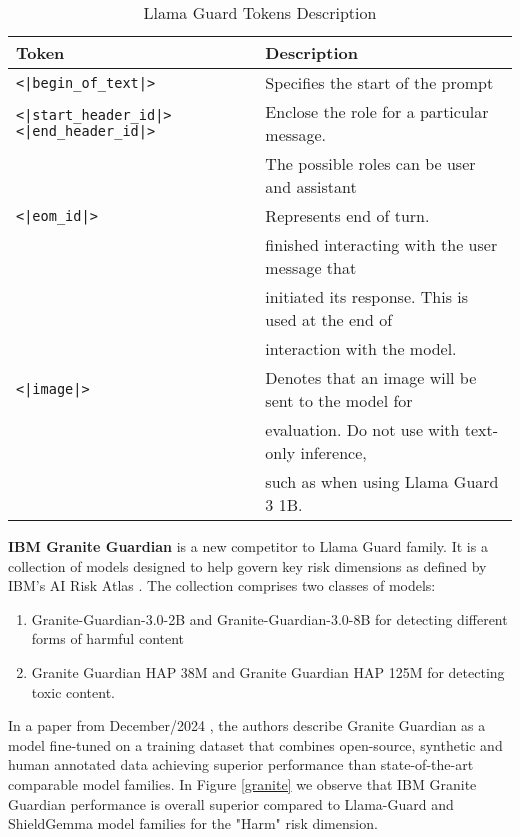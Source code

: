 \begin{table*}[h!]
\caption{Llama Guard Tokens Description}
\label{table:guard}
\begin{tabular}{ll}
\hline
Token & Description \\
\hline
\texttt{<|begin\_of\_text|>} & Specifies the start of the prompt \\
\texttt{<|start\_header\_id|>} \texttt{<|end\_header\_id|>} & Enclose the role for a particular message. \\
& The possible roles can be user and assistant \\
\texttt{<|eom\_id|>} & Represents end of turn. \\
& finished interacting with the user message that \\
& initiated its response. This is used at the end of \\
& interaction with the model. \\
\texttt{<|image|>} & Denotes that an image will be sent to the model for \\
& evaluation. Do not use with text-only inference, \\
& such as when using Llama Guard 3 1B. \\
\hline
\end{tabular}
\end{table*}


\textbf{IBM Granite Guardian}  is a new competitor to Llama Guard family. It is a collection of models designed to help govern key risk dimensions as defined by IBM's AI Risk Atlas . The collection comprises two classes of models:
\begin{enumerate}
    \item Granite-Guardian-3.0-2B and Granite-Guardian-3.0-8B for detecting different forms of harmful content 
    \item Granite Guardian HAP 38M and Granite Guardian HAP 125M for detecting toxic content.
\end{enumerate}

In a paper from December/2024 , the authors describe Granite Guardian as a model fine-tuned on a training dataset that combines open-source, synthetic and human annotated data achieving superior performance than state-of-the-art comparable model families. In Figure \ref{granite} we observe that IBM Granite Guardian performance is overall superior compared to Llama-Guard and ShieldGemma model families for the "Harm" risk dimension.

